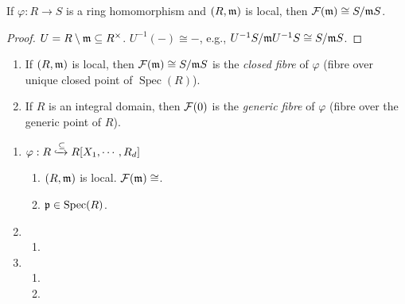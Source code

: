 \begin{proposition}
    If $\varphi:R \to S$ is a ring homomorphism and $(R,\mathfrak{m})$ is local, then $\mathcal{F}(\mathfrak{m}) \cong S/\mathfrak{m} S$.
\end{proposition}

\begin{proof}
    $U = R \setminus \mathfrak{m} \subseteq R^\times$. $U^{-1}(-) \cong -$, e.g., $U^{-1}S/\mathfrak{m} U^{-1}S \cong S/\mathfrak{m} S$.
\end{proof}

\begin{definition}
    \begin{enumerate}
        \item If $(R,\mathfrak{m})$ is local, then $\mathcal{F}(\mathfrak{m}) \cong S/\mathfrak{m} S$ is the \emph{closed fibre} of $\varphi$ (fibre over unique closed point of $\operatorname{Spec}(R)$).
        \item 
            If $R$ is an integral domain, then $\mathcal{F}(0)$ is the \emph{generic fibre} of $\varphi$ (fibre over the generic point of $R$).
    \end{enumerate}
\end{definition}

\begin{example}
    \begin{enumerate}
        \item $\varphi: R \xhookrightarrow \subseteq R[X_1,\cdots,R_d]$
            \begin{enumerate}
                \item $(R,\mathfrak{m})$ is local. $\mathcal{F}(\mathfrak{m}) \cong $.
                \item $\mathfrak{p} \in \operatorname{Spec}(R)$.
            \end{enumerate}
        \item 
            \begin{enumerate}
                \item
            \end{enumerate}
        \item
            \begin{enumerate}
                \item 
                \item 
            \end{enumerate}
    \end{enumerate}
\end{example}

